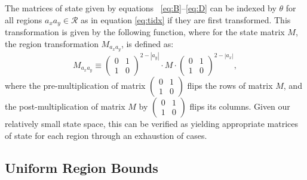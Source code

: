 The matrices of state given by equations
~\eqref{eq:B}--\eqref{eq:D} can be indexed by $\theta$
for all regions $a_xa_y \in \mathcal{R}$ as in
equation \eqref{eq:tidx} if they are first transformed.
This transformation is given by the following function, where
for the state matrix $M$, the
region transformation $M_{a_xa_y}$, is defined as:
\begin{equation}
  M_{a_xa_y} \equiv \begin{pmatrix}
  0 & 1\\
  1 & 0
  \end{pmatrix}^{2-|a_y|} \cdot M \cdot \begin{pmatrix}
  0 & 1\\
  1 & 0
  \end{pmatrix}^{2-|a_x|},
  \label{eq:flips}
\end{equation}
where the pre-multiplication of matrix
$\begin{pmatrix}
  0 & 1\\
  1 & 0
  \end{pmatrix}$ flips the rows of matrix $M$, and the post-multiplication
of matrix $M$ by $\begin{pmatrix}
  0 & 1\\
  1 & 0
  \end{pmatrix}$ flips its columns.  Given our relatively small state space,
this can be verified as yielding appropriate matrices of state
for each region through an exhaustion of cases.

\subsection{Uniform Region Bounds}

